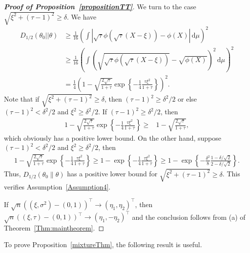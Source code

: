 \documentclass[11pt]{article}
\theoremstyle{plain}
\theoremstyle{definition}
\theoremstyle{remark}
\begin{document}
\begin{appendices}
\begin{proof}[\textbf{Proof of Proposition~\ref{propositionTT}}]
We turn to the case $\sqrt{\xi^2+(\tau-1)^2}\geq\delta$.
We have
\begin{equation*}
    \begin{split}
    D_{1/2}(\theta_0||\theta)
    &\geq
    \frac{1}{16}
    \left(\int \left|\sqrt{\tau}\phi(\sqrt{\tau}(X-\xi))-\phi(X)\right| \, \mathrm d\mu\right)^2
    \\
    &\geq
    \frac{1}{16}
\left(
\int \left(\sqrt{\sqrt{\tau}\phi(\sqrt{\tau}(X-\xi))}-\sqrt{\phi(X)}\right)^2 \, \mathrm d\mu
\right)^2
\\
&=
\frac{1}{4} 
\left( 
1- \sqrt{\frac{2 \sqrt \tau }{1+\tau}} \exp \left\{ - \frac{1}{4} \frac{\tau \xi^2}{1+\tau } \right\}
\right)^2
    .
\end{split}
\end{equation*}
Note that if $\sqrt{\xi^2 + (\tau-1)^2} \geq \delta$, then $(\tau-1)^2 \geq \delta^2/2$ or else $(\tau-1)^2 < \delta^2/2$ and $\xi^2 \geq \delta^2/2$.
If $(\tau-1)^2 \geq \delta^2/2$, then
\begin{align*}
1- \sqrt{\frac{2 \sqrt \tau }{1+\tau}} \exp \left\{ - \frac{1}{4} \frac{\tau \xi^2}{1+\tau } \right\}
\geq&
1- \sqrt{\frac{2 \sqrt \tau }{1+\tau}} 
,
\end{align*}
which obviously has a positive lower bound.
On the other hand, suppose $(\tau-1)^2 < \delta^2/2$ and $\xi^2 \geq \delta^2/2$,
then
\begin{align*}
1- \sqrt{\frac{2 \sqrt \tau }{1+\tau}} \exp \left\{ - \frac{1}{4} \frac{\tau \xi^2}{1+\tau } \right\}
\geq 
1- \exp \left\{ - \frac{1}{4} \frac{\tau \xi^2}{1+\tau } \right\}
\geq 
1- \exp \left\{ - \frac{\delta^2}{8} \frac{1-\delta/\sqrt 2}{2-\delta /\sqrt 2} \right\}.
\end{align*}
Thus, $D_{1/2}(\theta_0 \| \theta)$ has a positive lower bound for $\sqrt{\xi^2+(\tau-1)^2}\geq\delta$.
This verifies Assumption~\ref{Assumption4}.

If $\sqrt{n}((\xi,\sigma^2)-(0,1))^\top \to (\eta_1,\eta_2)^\top  $, then $\sqrt{n}((\xi,\tau)-(0,1))^\top \to (\eta_1,-\eta_2)^\top  $ and the conclusion follows from (a) of Theorem~\ref{Thm:maintheorem}.
\end{proof}


To prove Proposition~\ref{mixtureThm}, the following result is useful.


\end{appendices}
\end{document}
